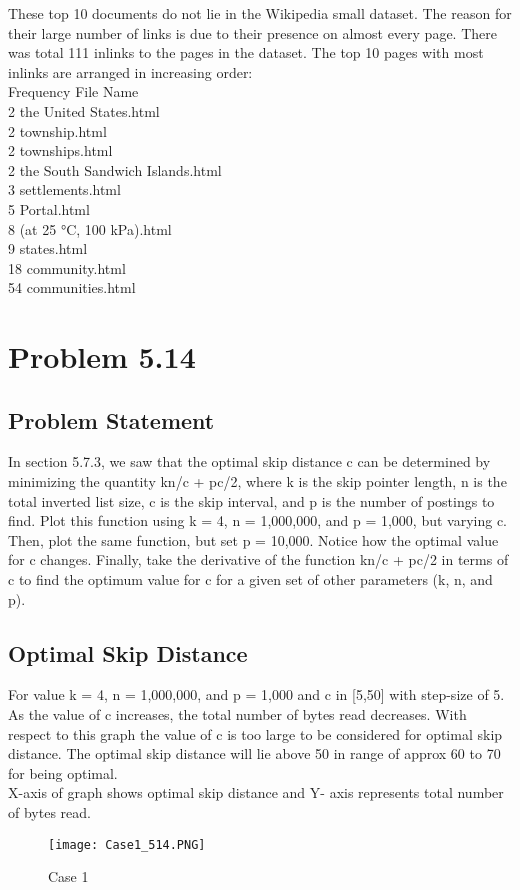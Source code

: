 \documentclass[12pt]{report}
\begin{document}
These top 10 documents do not lie in the Wikipedia small dataset. The reason for their large number of links is due to their presence on almost every page. There was total 111 inlinks to the pages in the dataset. The top 10 pages with most inlinks are arranged in increasing order:\\
    Frequency File Name\\
      2 the United States.html\\
      2 township.html\\
      2 townships.html\\
      2 the South Sandwich Islands.html\\
      3 settlements.html\\
      5 Portal.html\\
      8 (at 25 °C, 100 kPa).html\\
      9 states.html\\
     18 community.html\\
     54 communities.html\\

\chapter{Problem 5.14}
\section{Problem Statement}
In section 5.7.3, we saw that the optimal skip distance c can be determined by minimizing the quantity kn/c + pc/2, where k is the skip pointer length, n is the total inverted list size, c is the skip interval, and p is the number of postings to find. Plot this function using k = 4, n = 1,000,000, and p = 1,000, but varying c. Then, plot the same function, but set p = 10,000. Notice how the optimal value for c changes. Finally, take the derivative of the function kn/c + pc/2 in terms of c to find the optimum value for c for a given set of other parameters (k, n, and p).
\section{Optimal Skip Distance}

For value  k = 4, n = 1,000,000, and p = 1,000 and c in [5,50] with step-size of 5. As the value of c increases, the total number of bytes read decreases. With respect to this graph the value of c is too large to be considered for optimal skip distance. The optimal skip distance will lie above 50 in range of approx  60 to 70 for being optimal.  \\
X-axis of graph shows optimal skip distance and Y- axis represents   total number of bytes read.
\begin{figure}[ht] 
  \centering
  \texttt{[image: Case1\_514.PNG]}
  \caption{Case 1}
  \label{fig:25}
\end{figure}
\end{document}
